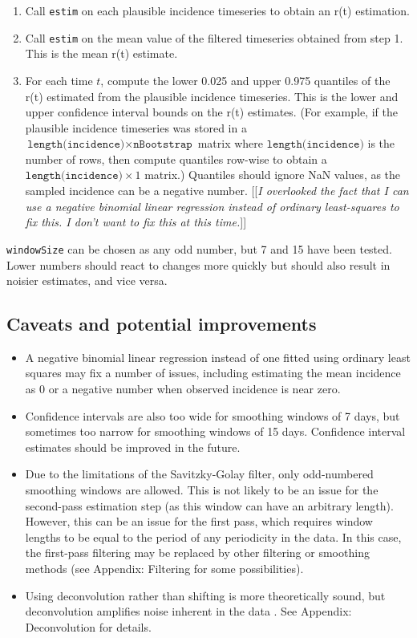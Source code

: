 \documentclass{article}
\newcommand{\code}[1]{\texttt{#1}}
\newcommand{\msComment}[1]{[[\textsl{#1}]]}
\begin{document}
\begin{enumerate}
	\item Call \code{estim} on each plausible incidence timeseries to obtain an r(t) estimation. 
	
	\item Call \code{estim} on the mean value of the filtered timeseries obtained from step 1. This is the mean r(t) estimate.
	
	\item For each time $t$, compute the lower 0.025 and upper 0.975 quantiles of the r(t) estimated from the plausible incidence timeseries. This is the lower and upper confidence interval bounds on the r(t) estimates. (For example, if the plausible incidence timeseries was stored in a $\code{length(incidence)} \times \code{nBootstrap}$ matrix where $\code{length(incidence)}$ is the number of rows, then compute quantiles row-wise to obtain a $\code{length(incidence)} \times 1$ matrix.) Quantiles should ignore NaN values, as the sampled incidence can be a negative number. \msComment{I overlooked the fact that I can use a negative binomial linear regression instead of ordinary least-squares to fix this. I don't want to fix this at this time.}
\end{enumerate}

\code{windowSize} can be chosen as any odd number, but 7 and 15 have been tested. Lower numbers should react to changes more quickly but should also result in noisier estimates, and vice versa.

\subsection{Caveats and potential improvements}
\begin{itemize}
	\item A negative binomial linear regression instead of one fitted using ordinary least squares may fix a number of issues, including estimating the mean incidence as 0 or a negative number when observed incidence is near zero. 
	\item Confidence intervals are also too wide for smoothing windows of 7 days, but sometimes too narrow for smoothing windows of 15 days. Confidence interval estimates should be improved in the future.
	\item Due to the limitations of the Savitzky-Golay filter, only odd-numbered smoothing windows are allowed. This is not likely to be an issue for the second-pass estimation step (as this window can have an arbitrary length). However, this can be an issue for the first pass, which requires window lengths to be equal to the period of any periodicity in the data. In this case, the first-pass filtering may be replaced by other filtering or smoothing methods (see Appendix: Filtering  for some possibilities). 
	
	\item Using deconvolution rather than shifting is more theoretically sound, but deconvolution amplifies noise inherent in the data \cite{Gostic} \cite{RLLoss}. See Appendix: Deconvolution for details.
\end{itemize}
\end{document}
